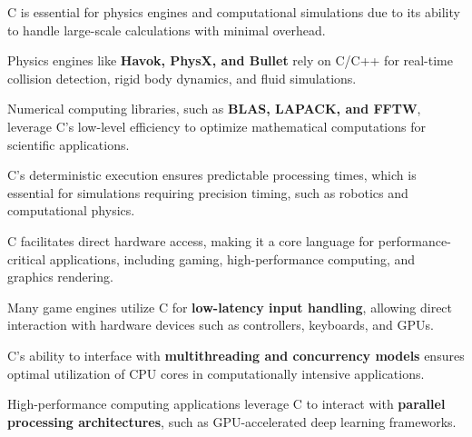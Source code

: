\begin{NxSSSSBox}
	\begin{NxIDBox}
		C is essential for physics engines and computational simulations due to its ability to handle large-scale calculations with minimal overhead.
	\end{NxIDBox}
	\begin{NxIDBox}
		Physics engines like \textbf{Havok, PhysX, and Bullet} rely on C/C++ for real-time collision detection, rigid body dynamics, and fluid simulations.
	\end{NxIDBox}
	\begin{NxIDBox}
		Numerical computing libraries, such as \textbf{BLAS, LAPACK, and FFTW}, leverage C’s low-level efficiency to optimize mathematical computations for scientific applications.
	\end{NxIDBox}
	\begin{NxIDBox}
		C’s deterministic execution ensures predictable processing times, which is essential for simulations requiring precision timing, such as robotics and computational physics.
	\end{NxIDBox}
\end{NxSSSSBox}

\begin{NxSSSSBox}
	\begin{NxIDBox}
		C facilitates direct hardware access, making it a core language for performance-critical applications, including gaming, high-performance computing, and graphics rendering.
	\end{NxIDBox}
	\begin{NxIDBox}
		Many game engines utilize C for \textbf{low-latency input handling}, allowing direct interaction with hardware devices such as controllers, keyboards, and GPUs.
	\end{NxIDBox}
	\begin{NxIDBox}
		C’s ability to interface with \textbf{multithreading and concurrency models} ensures optimal utilization of CPU cores in computationally intensive applications.
	\end{NxIDBox}
	\begin{NxIDBox}
		High-performance computing applications leverage C to interact with \textbf{parallel processing architectures}, such as GPU-accelerated deep learning frameworks.
	\end{NxIDBox}
\end{NxSSSSBox}


